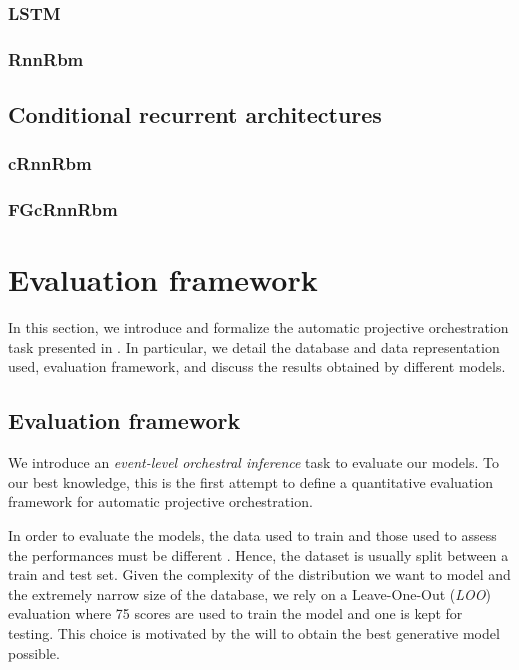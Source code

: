 \documentclass{article}
\begin{document}
\subsubsection{LSTM}
\subsubsection{RnnRbm}

\subsection{Conditional recurrent architectures}
\subsubsection{cRnnRbm}
\subsubsection{FGcRnnRbm}

\section{Evaluation framework}
In this section, we introduce and formalize the automatic projective orchestration task presented in . In particular, we detail the database and data representation used, evaluation framework, and discuss the results obtained by different models.

\subsection{Evaluation framework}
We introduce an \textit{event-level orchestral inference} task to evaluate our models. To our best knowledge, this is the first attempt to define a quantitative evaluation framework for automatic projective orchestration.

In order to evaluate the models, the data used to train and those used to assess the performances must be different \cite{bishop2006pattern}. Hence, the dataset is usually split between a train and test set.
Given the complexity of the distribution we want to model and the extremely narrow size of the database, we rely on a Leave-One-Out (\textit{LOO}) evaluation where 75 scores are used to train the model and one is kept for testing. This choice is motivated by the will to obtain the best generative model possible.
\end{document}
